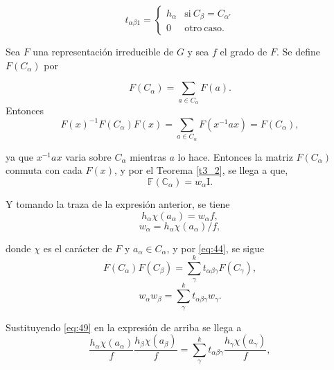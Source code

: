\documentclass[12pt]{book}
\theoremstyle{definition}
\newcounter{in}
\begin{document}
\begin{equation}
  \label{eq:46}
   t_{\alpha \beta 1} = \left\{
     \begin{array}{ll}
       h_{\alpha}      & \mathrm{si\ } C_{\beta} = C_{\alpha '} \\
       0      & \mathrm{otro\ caso.\ } 
     \end{array}
   \right.
\end{equation}

Sea $F$ una representación irreducible
de $G$ y sea $f$ el grado de $F$. Se define
$F (C_{\alpha})$ por

\begin{equation}
  \label{eq:45}
  F (C_{\alpha}) = \sum_{a \in C_{\alpha}} F(a).
\end{equation}
Entonces
\begin{equation}
  \label{eq:47}
  F(x)^{-1}F(C_{\alpha})F(x)=\sum_{a \in C_{\alpha}}F(x^{-1}ax)=F(C_{\alpha}),
\end{equation}

ya que $x^{-1}ax$ varia sobre $C_{\alpha}$ mientras $a$ lo
hace. Entonces la matriz $F (C_{\alpha})$ conmuta con cada $F(x)$, y
por el Teorema \ref{t3_2}, se llega a que,
\begin{equation}
  \label{eq:48}
   \mathbb{F} (\mathbb{C}_{\alpha})=w_{\alpha}\mathrm{I}.
\end{equation}

Y tomando la traza de la expresión anterior, se tiene
\begin{equation}
  \label{eq:49}
  h_{\alpha}\chi(a_{\alpha})=w_{\alpha}f,
\end{equation}
\begin{equation}
  \label{eq:50}
  w_{\alpha}=h_{\alpha}\chi(a_{\alpha})/f,
\end{equation}

donde $\chi$ es el carácter de $F$ y
$a_{\alpha} \in C_{\alpha}$, y por \ref{eq:44}, se sigue
\begin{equation}
  \label{eq:51}
  F (C_{\alpha})  F (C_{\beta}) = \sum_{\gamma}^{k} t_{\alpha \beta \gamma} F(C_{\gamma}),
\end{equation}
\begin{equation}
  \label{eq:52}
  w_{\alpha}w_{\beta} = \sum_{\gamma}^{k} t_{\alpha \beta \gamma} w_{\gamma}.
\end{equation}

Sustituyendo \ref{eq:49} en la expresión de arriba se llega a
\begin{equation*}
  \frac{h_{\alpha} \chi(a_{\alpha})}{f} \frac{h_{\beta} \chi(a_{\beta})}{f} = \sum_{\gamma}^{k} t_{\alpha \beta \gamma} \frac{h_{\gamma} \chi(a_{\gamma})}{f},
\end{equation*}
\end{document}
